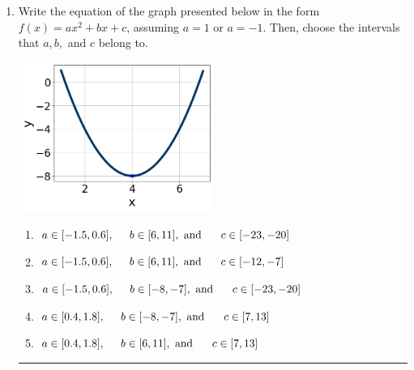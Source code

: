 \documentclass[14pt]{extbook}
\newcommand{\litem}[1]{\item#1\hspace*{-1cm}\rule{\textwidth}{0.4pt}}
\begin{document}
\begin{enumerate}
{\begin{enumerate}[label=\Alph*.]
\end{enumerate} }
\litem{
Write the equation of the graph presented below in the form $f(x)=ax^2+bx+c$, assuming  $a=1$ or $a=-1$. Then, choose the intervals that $a, b,$ and $c$ belong to.
\begin{center}
    \includegraphics[width=0.5\textwidth]{../Figures/quadraticGraphToEquationC.png}
\end{center}
\begin{enumerate}[label=\Alph*.]
\item \( a \in [-1.5, 0.6], \hspace*{5mm} b \in [6, 11], \text{ and } \hspace*{5mm} c \in [-23, -20] \)
\item \( a \in [-1.5, 0.6], \hspace*{5mm} b \in [6, 11], \text{ and } \hspace*{5mm} c \in [-12, -7] \)
\item \( a \in [-1.5, 0.6], \hspace*{5mm} b \in [-8, -7], \text{ and } \hspace*{5mm} c \in [-23, -20] \)
\item \( a \in [0.4, 1.8], \hspace*{5mm} b \in [-8, -7], \text{ and } \hspace*{5mm} c \in [7, 13] \)
\item \( a \in [0.4, 1.8], \hspace*{5mm} b \in [6, 11], \text{ and } \hspace*{5mm} c \in [7, 13] \)


\end{enumerate}}
\end{enumerate}
\end{document}
